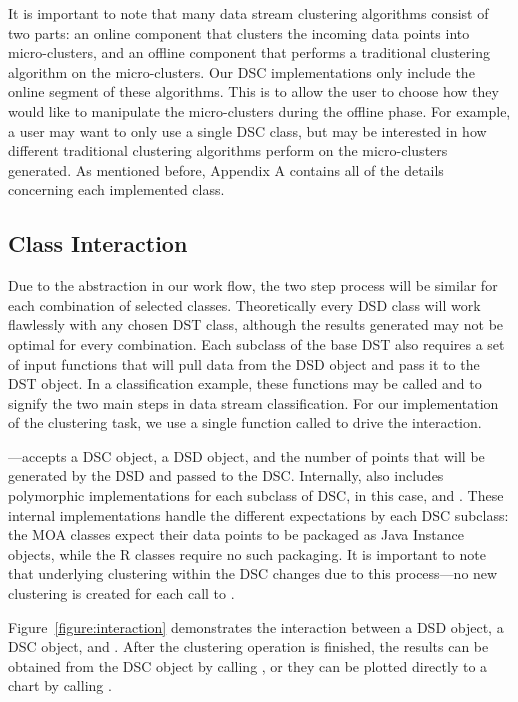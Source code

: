 \documentclass[nojss]{jss}
\begin{document}
It is important to note that many data stream clustering algorithms consist of two parts: an online component that clusters the incoming data points into micro-clusters, and an offline component that performs a traditional clustering algorithm on the micro-clusters. Our DSC implementations only include the online segment of these algorithms. This is to allow the user to choose how they would like to manipulate the micro-clusters during the offline phase. For example, a user may want to only use a single DSC class, but may be interested in how different traditional clustering algorithms perform on the micro-clusters generated. As mentioned before, Appendix A contains all of the details concerning each implemented class.


\subsection{Class Interaction}
\label{sec:design:interaction}

Due to the abstraction in our work flow, the two step process will be similar for each combination of selected classes. Theoretically every DSD class will work flawlessly with any chosen DST class, although the results generated may not be optimal for every combination. Each subclass of the base DST also requires a set of input functions that will pull data from the DSD object and pass it to the DST object. In a classification example, these functions may be called  and  to signify the two main steps in data stream classification. For our implementation of the clustering task, we use a single function called  to drive the interaction.


%
---accepts a DSC object, a DSD object, and the number of points that will be generated by the DSD and passed to the DSC. Internally,  also includes polymorphic implementations for each subclass of DSC, in this case,  and . These internal implementations handle the different expectations by each DSC subclass: the MOA classes expect their data points to be packaged as Java Instance objects, while the R classes require no such packaging. It is important to note that underlying clustering within the DSC changes due to this process---no new clustering is created for each call to .


Figure~\ref{figure:interaction} demonstrates the interaction between a DSD object, a DSC object, and . After the clustering operation is finished, the results can be obtained from the DSC object by calling , or they can be plotted directly to a chart by calling .
\end{document}
